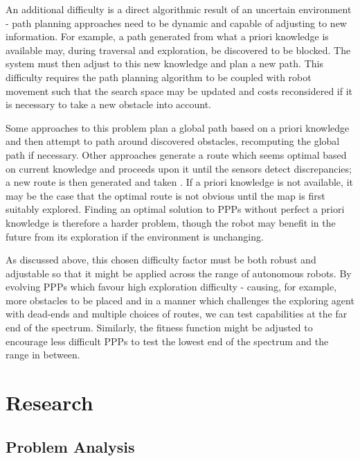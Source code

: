 \documentclass[authoryearcitations]{UoYCSproject}
\begin{document}
An additional difficulty is a direct algorithmic result of an uncertain environment - path planning approaches need to be dynamic and capable of adjusting to new information. For example, a path generated from what a priori knowledge is available may, during traversal and exploration, be discovered to be blocked. The system must then adjust to this new knowledge and plan a new path. This difficulty requires the path planning algorithm to be coupled with robot movement such that the search space may be updated and costs reconsidered if it is necessary to take a new obstacle into account.

Some approaches to this problem plan a global path based on a priori knowledge and then attempt to path around discovered obstacles, recomputing the global path if necessary. Other approaches generate a route which seems optimal based on current knowledge and proceeds upon it until the sensors detect discrepancies; a new route is then generated and taken \cite{stentz}. If a priori knowledge is not available, it may be the case that the optimal route is not obvious until the map is first suitably explored. Finding an optimal solution to PPPs without perfect a priori knowledge is therefore a harder problem, though the robot may benefit in the future from its exploration if the environment is unchanging.

As discussed above, this chosen difficulty factor must be both robust and adjustable so that it might be applied across the range of autonomous robots. By evolving PPPs which favour high exploration difficulty - causing, for example, more obstacles to be placed and in a manner which challenges the exploring agent with dead-ends and multiple choices of routes, we can test capabilities at the far end of the spectrum.
Similarly, the fitness function might be adjusted to encourage less difficult PPPs to test the lowest end of the spectrum and the range in between.

\part{Research}
\label{sec:research}

\chapter{Problem Analysis}
\label{cha:ProbAnalysis}
\end{document}
